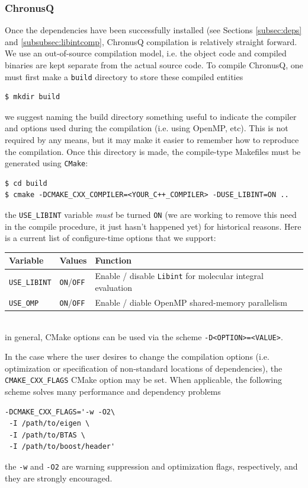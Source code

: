 \documentclass[12pt]{article}
\begin{document}
\subsubsection{ChronusQ} \label{subsubsec:chronusqcomp}
Once the dependencies have been successfully installed (see Sections \ref{subsec:deps} and \ref{subsubsec:libintcomp}, ChronusQ compilation is relatively straight forward. We use an out-of-source compilation model, i.e. the object code and compiled binaries are kept separate from the actual source code. To compile ChronusQ, one must first make a \texttt{build} directory to store these compiled entities
\begin{lstlisting}
$ mkdir build
\end{lstlisting}
we suggest naming the build directory something useful to indicate the compiler and options used during the compilation (i.e. using OpenMP, etc). This is not required by any means, but it may make it easier to remember how to reproduce the compilation. Once this directory is made, the compile-type Makefiles must be generated using \texttt{CMake}:
\begin{lstlisting}
$ cd build
$ cmake -DCMAKE_CXX_COMPILER=<YOUR_C++_COMPILER> -DUSE_LIBINT=ON ..
\end{lstlisting}
the \texttt{USE\_LIBINT} variable \emph{must} be turned \texttt{ON} (we are working to remove this need in the compile procedure, it just hasn't happened yet) for historical reasons. Here is a current list of configure-time options that we support:
\begin{table}[h!]
\begin{center}
\begin{tabular}{|l|l|l|}
\hline
Variable & Values & Function\\
\hline
\hline
\texttt{USE\_LIBINT} & \texttt{ON}/\texttt{OFF} & Enable / disable \texttt{Libint} for molecular integral evaluation\\
\hline
\texttt{USE\_OMP} & \texttt{ON}/\texttt{OFF} & Enable / diable OpenMP shared-memory parallelism\\
\hline
\end{tabular}
\end{center}
\end{table}
\\in general, CMake options can be used via the scheme \texttt{-D<OPTION>=<VALUE>}.

In the case where the user desires to change the compilation options (i.e. optimization or specification of non-standard locations of dependencies), the \texttt{CMAKE\_CXX\_FLAGS} CMake option may be set. When applicable, the following scheme solves many performance and dependency problems
\begin{lstlisting}
-DCMAKE_CXX_FLAGS='-w -O2\
 -I /path/to/eigen \ 
 -I /path/to/BTAS \
 -I /path/to/boost/header'
\end{lstlisting}
the \texttt{-w} and \texttt{-O2} are warning suppression and optimization flags, respectively, and they are strongly encouraged.
\end{document}
